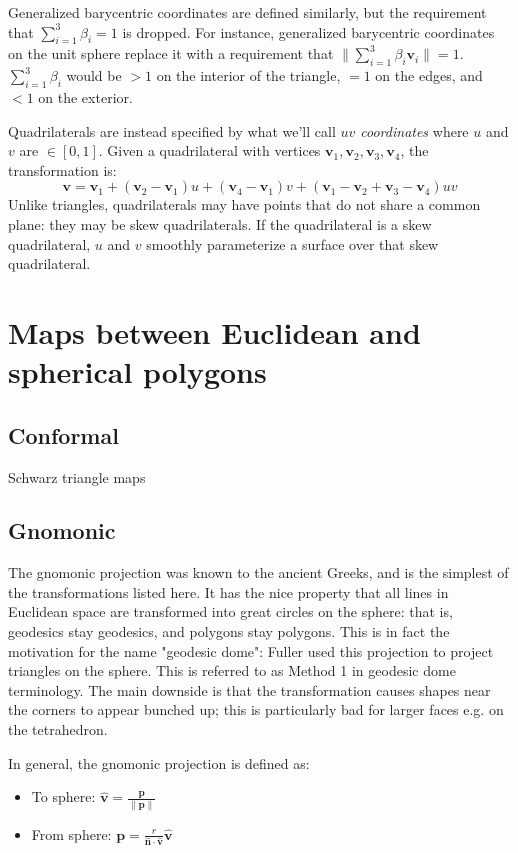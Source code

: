\documentclass{amsart}[12pt]
\begin{document}
Generalized barycentric coordinates are defined similarly, but the requirement
that $\sum^3_{i=1} \beta_i = 1$ is dropped. For instance, generalized
barycentric coordinates on the unit sphere replace it with a requirement that
$\| \sum^3_{i=1} \beta_i \mathbf v_i \| = 1$. $\sum^3_{i=1} \beta_i$ would be
$>1$ on the interior of the triangle, $=1$ on the edges, and $<1$ on the exterior.

Quadrilaterals are instead specified by what we'll call \textit{$uv$
coordinates} where $u$ and $v$ are $\in [0, 1]$. Given a quadrilateral with
vertices $\mathbf v_1, \mathbf v_2, \mathbf v_3, \mathbf v_4$, the
transformation is:
\begin{equation}
\mathbf v = \mathbf v_1 + (\mathbf v_2-\mathbf v_1) u + (\mathbf v_4-\mathbf v_1) v + (\mathbf v_1-\mathbf v_2+\mathbf v_3-\mathbf v_4)uv
\end{equation}
Unlike triangles, quadrilaterals may have points that do not share a common
plane: they may be skew quadrilaterals. If the quadrilateral is a skew
quadrilateral, $u$ and $v$ smoothly parameterize a surface over that skew
quadrilateral.

\section{Maps between Euclidean and spherical polygons}
\subsection{Conformal}

Schwarz triangle maps

\subsection{Gnomonic}
The gnomonic projection was known to the ancient Greeks, and is the simplest
of the transformations listed here. It has the nice property that all lines in
Euclidean space are transformed into great circles on the sphere: that is,
geodesics stay geodesics, and polygons stay polygons. This is in fact the
motivation for the name "geodesic dome": Fuller used this projection to project
triangles on the sphere. This is referred to as Method 1 in geodesic dome
terminology. The main downside is that the transformation causes shapes
near the corners to appear bunched up;
this is particularly bad for larger faces e.g. on the tetrahedron.

In general, the gnomonic projection is defined as:
\begin{itemize}
\item To sphere: $\hat{\mathbf v} = \frac{\mathbf p}{\|\mathbf p\|}$
\item From sphere: $\mathbf p = \frac{r}
  {\hat{\mathbf n} \cdot \hat{\mathbf v}}\hat{\mathbf v}$
\end{itemize}
\end{document}
